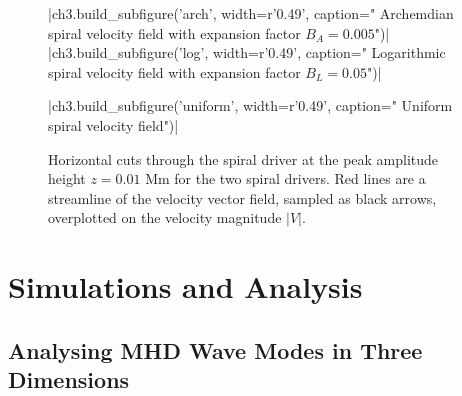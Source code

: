 \begin{figure}[H]
	\py[chapter3]|ch3.build_subfigure('arch', width=r'0.49\columnwidth', caption="
	Archemdian spiral velocity field with expansion factor $B_A=0.005$")|
	\py[chapter3]|ch3.build_subfigure('log', width=r'0.49\columnwidth', caption="
	Logarithmic spiral velocity field with expansion factor $B_L=0.05$")|

	\centering
	\py[chapter3]|ch3.build_subfigure('uniform', width=r'0.49\columnwidth', caption="
	Uniform spiral velocity field")|
	
	\caption{Horizontal cuts through the spiral driver at the peak amplitude height $z = 0.01$ Mm for the two spiral drivers. Red lines are a streamline of the velocity vector field, sampled as black arrows, overplotted on the velocity magnitude $|V|$.}
	\label{fig:spiral_driver_cut}
\end{figure}

\section{Simulations and Analysis}\label{sec:sim_and_analysis}


\subsection{Analysing MHD Wave Modes in Three Dimensions}\label{sec:3d_analysis}

